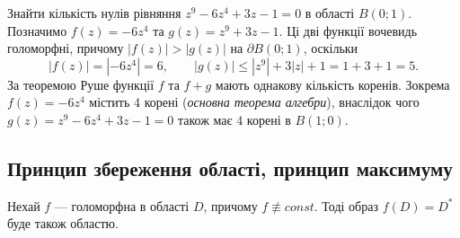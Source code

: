 \documentclass{math_library}
\begin{document}
\begin{example}
Знайти кількість нулів рівняння $z^9 - 6z^4 + 3z - 1 = 0$ в області $B(0;1)$.
\bigskip \\
Позначимо $f(z) = -6z^4$ та $g(z) = z^9 + 3z - 1$. Ці дві функції вочевидь голоморфні, причому $|f(z)| > |g(z)|$ на $\partial B(0;1)$, оскільки
\[
|f(z)| = |-6z^4| = 6, \qquad |g(z)| \leq |z^9| + 3 |z| + 1 = 1 + 3 + 1 = 5.
\]
За теоремою Руше функції $f$ та $f+g$ мають однакову кількість коренів. Зокрема $f(z) = -6z^4$ містить $4$ корені (\textit{основна теорема алгебри}), внаслідок чого $g(z) = z^9 - 6z^4 + 3z - 1 = 0$ також має $4$ корені в $B(1;0)$.
\end{example}

\subsection{Принцип збереження області, принцип максимуму}
\begin{theorem}
Нехай $f$ --- голоморфна в області $D$, причому $f \not\equiv const$. Тоді образ $f(D) = D^*$ буде також областю.
\end{theorem}
\end{document}
